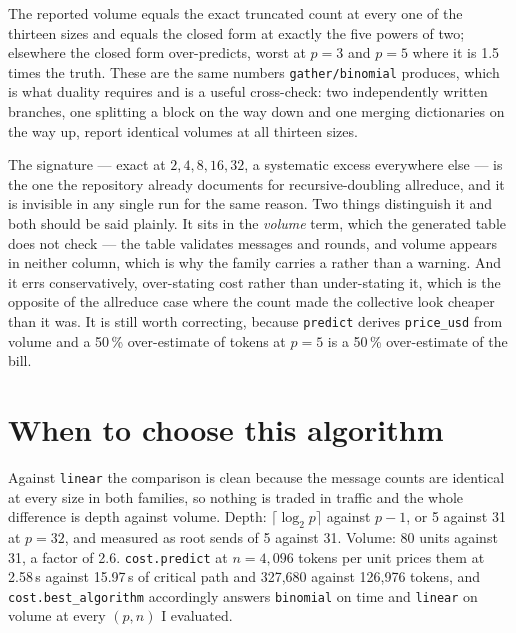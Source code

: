 \documentclass[11pt]{article}
\begin{document}
The reported volume equals the exact truncated count at every one of the thirteen sizes and equals
the closed form at exactly the five powers of two; elsewhere the closed form over-predicts, worst
at $p=3$ and $p=5$ where it is 1.5 times the truth. These are the same numbers
\texttt{gather/binomial} produces, which is what duality requires and is a useful cross-check:
two independently written branches, one splitting a block on the way down and one merging
dictionaries on the way up, report identical volumes at all thirteen sizes.

The signature --- exact at $2, 4, 8, 16, 32$, a systematic excess everywhere else --- is the one
the repository already documents for recursive-doubling allreduce, and it is invisible in any
single run for the same reason. Two things distinguish it and both should be said plainly. It sits
in the \emph{volume} term, which the generated table does not check --- the table validates
messages and rounds, and volume appears in neither column, which is why the family carries a
 rather than a warning. And it errs conservatively, over-stating cost rather than
under-stating it, which is the opposite of the allreduce case where the count made the collective
look cheaper than it was. It is still worth correcting, because \texttt{predict} derives
\texttt{price\_usd} from volume and a 50\,\% over-estimate of tokens at $p=5$ is a 50\,\%
over-estimate of the bill.

\section{When to choose this algorithm}

Against \texttt{linear} the comparison is clean because the message counts are identical at every
size in both families, so nothing is traded in traffic and the whole difference is depth against
volume. Depth: $\lceil\log_2 p\rceil$ against $p-1$, or 5 against 31 at $p=32$, and measured as
root sends of 5 against 31. Volume: 80 units against 31, a factor of 2.6.
\texttt{cost.predict} at $n = 4{,}096$ tokens per unit prices them at 2.58\,s against 15.97\,s of
critical path and 327,680 against 126,976 tokens, and \texttt{cost.best\_algorithm} accordingly
answers \texttt{binomial} on time and \texttt{linear} on volume at every $(p, n)$ I evaluated.
\end{document}
